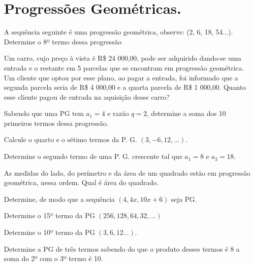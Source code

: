 \chapter{Progressões Geométricas.}

\item A sequência seguinte é uma progressão geométrica, observe: (2, 6, 18, 54...). Determine o 8º termo dessa progressão

\item Um carro, cujo preço à vista é R\$ 24 000,00, pode ser adquirido dando-se uma entrada e o restante em 5 parcelas que se encontram em progressão geométrica. Um cliente que optou por esse plano, ao pagar a entrada, foi informado que a segunda parcela seria de R\$ 4 000,00 e a quarta parcela de R\$ 1 000,00. Quanto esse cliente pagou de entrada na aquisição desse carro?

\item Sabendo que uma PG tem $a_1 = 4$ e razão $q = 2$, determine a soma dos 10 primeiros termos dessa progressão. 

\item Calcule o quarto e o sétimo termos da P. G. $(3, -6, 12,...)$.

\item Determine o segundo termo de uma P. G. crescente tal que $a_1 = 8$ e $a_3 = 18$.

\item As medidas do lado, do perímetro e da área de um quadrado estão em progressão geométrica, nessa ordem. Qual é área do quadrado.

\item Determine, de modo que a sequência $(4, 4x , 10x +6)$ seja PG.

\item Determine o 15º termo da PG $(256,128,64,32,...)$

\item Determine o 10º termo da PG $(3,6,12...)$.

\item Determine a PG de três termos sabendo do que o produto desses termos é 8 a soma do 2º com o 3º termo é 10.

